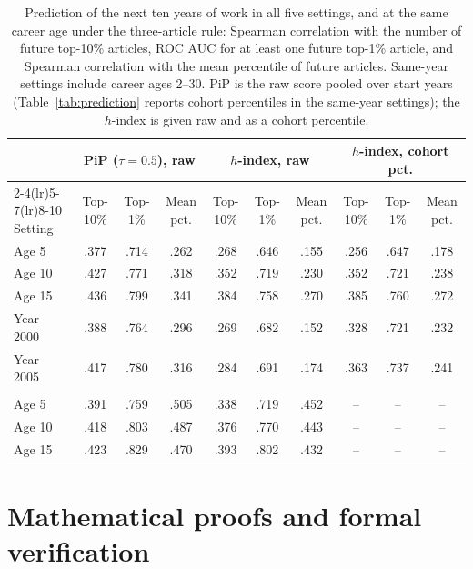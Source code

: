 \documentclass[11pt]{article}
\begin{document}
\begin{table}[ht]
  \centering
  \footnotesize
  \setlength{\tabcolsep}{4pt}
  \caption{Prediction of the next ten years of work in all five settings, and at the same career age under the
  three-article rule: Spearman correlation with the number of future top-10\% articles, ROC AUC for at least one future
  top-1\% article, and Spearman correlation with the mean percentile of future articles. Same-year settings include
  career ages 2--30. PiP is the raw score pooled over start years (Table~\ref{tab:prediction} reports cohort
  percentiles in the same-year settings); the $h$-index is given raw and as a cohort percentile.}
  \label{tab:predictionall}
  \begin{tabular}{lccccccccc}
    \toprule
    & \multicolumn{3}{c}{PiP ($\tau = 0.5$), raw} & \multicolumn{3}{c}{$h$-index, raw} & \multicolumn{3}{c}{$h$-index, cohort pct.} \\
    \cmidrule(lr){2-4}\cmidrule(lr){5-7}\cmidrule(lr){8-10}
    Setting & Top-10\% & Top-1\% & Mean pct. & Top-10\% & Top-1\% & Mean pct. & Top-10\% & Top-1\% & Mean pct. \\
    \midrule
    Age 5 & .377 & .714 & .262 & .268 & .646 & .155 & .256 & .647 & .178 \\
    Age 10 & .427 & .771 & .318 & .352 & .719 & .230 & .352 & .721 & .238 \\
    Age 15 & .436 & .799 & .341 & .384 & .758 & .270 & .385 & .760 & .272 \\
    Year 2000 & .388 & .764 & .296 & .269 & .682 & .152 & .328 & .721 & .232 \\
    Year 2005 & .417 & .780 & .316 & .284 & .691 & .174 & .363 & .737 & .241 \\
    \addlinespace
    \multicolumn{10}{l}{\emph{Three-article rule}} \\
    Age 5 & .391 & .759 & .505 & .338 & .719 & .452 & -- & -- & -- \\
    Age 10 & .418 & .803 & .487 & .376 & .770 & .443 & -- & -- & -- \\
    Age 15 & .423 & .829 & .470 & .393 & .802 & .432 & -- & -- & -- \\
    \bottomrule
  \end{tabular}
\end{table}

\clearpage
\section{Mathematical proofs and formal verification}
\label{app:proofs}
\newcommand{\Peers}{{\mathcal{P}\mkern2.5mu}}
\providecommand{\square}{\mdlgwhtsquare}
\end{document}
